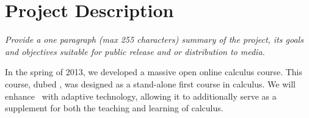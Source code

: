 \section{Project Description}

\textsl{Provide a one paragraph (max 255 characters) summary of the project,
its goals and objectives suitable for public release and or
distribution to media.}

\vspace{\topsep}

In the spring of 2013, we developed a massive open online calculus
course. This course, dubed \mooculus, was designed as a stand-alone
first course in calculus.  We will enhance \mooculus\ with adaptive
technology, allowing it to additionally serve as a supplement for both
the teaching and learning of calculus.






